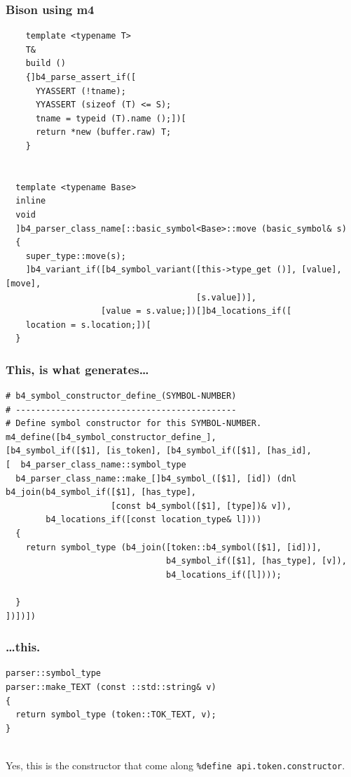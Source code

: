 \documentclass{beamer}
\begin{document}
\begin{frame}[fragile,shrink=25]
  \frametitle{Bison using m4}
  \begin{verbatim}
    template <typename T>
    T&
    build ()
    {]b4_parse_assert_if([
      YYASSERT (!tname);
      YYASSERT (sizeof (T) <= S);
      tname = typeid (T).name ();])[
      return *new (buffer.raw) T;
    }


  template <typename Base>
  inline
  void
  ]b4_parser_class_name[::basic_symbol<Base>::move (basic_symbol& s)
  {
    super_type::move(s);
    ]b4_variant_if([b4_symbol_variant([this->type_get ()], [value], [move],
                                      [s.value])],
                   [value = s.value;])[]b4_locations_if([
    location = s.location;])[
  }
\end{verbatim}
\end{frame}

\begin{frame}[fragile,shrink=25]
  \frametitle{This, is what generates\ldots}
\begin{verbatim}
# b4_symbol_constructor_define_(SYMBOL-NUMBER)
# --------------------------------------------
# Define symbol constructor for this SYMBOL-NUMBER.
m4_define([b4_symbol_constructor_define_],
[b4_symbol_if([$1], [is_token], [b4_symbol_if([$1], [has_id],
[  b4_parser_class_name::symbol_type
  b4_parser_class_name::make_[]b4_symbol_([$1], [id]) (dnl
b4_join(b4_symbol_if([$1], [has_type],
                     [const b4_symbol([$1], [type])& v]),
        b4_locations_if([const location_type& l])))
  {
    return symbol_type (b4_join([token::b4_symbol([$1], [id])],
                                b4_symbol_if([$1], [has_type], [v]),
                                b4_locations_if([l])));

  }
])])])
\end{verbatim}
\end{frame}

\begin{frame}[fragile]
  \frametitle{\ldots this.}
\begin{verbatim}
parser::symbol_type
parser::make_TEXT (const ::std::string& v)
{
  return symbol_type (token::TOK_TEXT, v);
}


\end{verbatim}

\pause

Yes, this is the constructor that come along \texttt{\%define
api.token.constructor}.
\end{frame}
\end{document}
